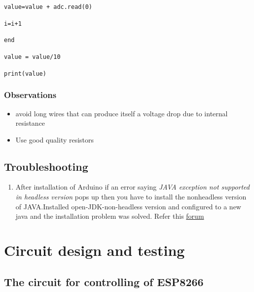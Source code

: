 \documentclass[16pt]{article}
\begin{document}
\texttt{value=value + adc.read(0)}

\texttt{i=i+1}

\texttt{end}

\texttt{value = value/10}

\texttt{print(value)}



\subsubsection{Observations}

\begin{itemize}

\item
  avoid long wires that can produce itself a voltage drop due to
  internal resistance
\item
  Use good quality resistors
\end{itemize}



\subsection{Troubleshooting}

\begin{enumerate}

\item
  After installation of Arduino if an error saying \emph{JAVA exception
  not supported in headless version} pops up then you have to install
  the nonheadless version of JAVA.Installed open-JDK-non-headless
  version and configured to a new java and the installation problem was
  solved. Refer this
 \href{http://askubuntu.com/questions/26474/unable-to-install-arduino}{forum}
\end{enumerate}





\vspace{15cm}

\section{Circuit design and testing}
\subsection{The circuit for controlling of ESP8266}

\vspace{0.5cm}
\end{document}
